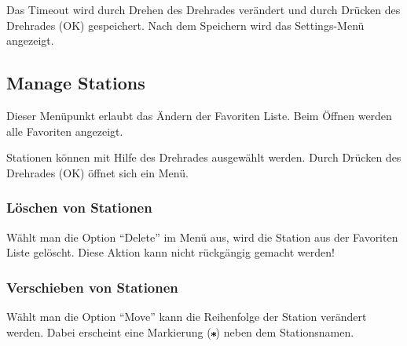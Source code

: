\documentclass[12pt,a4paper,openany]{memoir}
\begin{document}
Das Timeout wird durch Drehen des Drehrades verändert und durch Drücken des Drehrades (OK) gespeichert. Nach dem Speichern wird das Settings-Menü angezeigt. 


\subsection{Manage Stations}
Dieser Menüpunkt erlaubt das Ändern der Favoriten Liste. Beim Öffnen werden alle Favoriten angezeigt. 


Stationen können mit Hilfe des Drehrades ausgewählt werden. Durch Drücken des Drehrades (OK) öffnet sich ein Menü. 


\subsubsection{Löschen von Stationen}
Wählt man die Option ``Delete'' im Menü aus, wird die Station aus der Favoriten Liste gelöscht. 
Diese Aktion kann nicht rückgängig gemacht werden!

\subsubsection{Verschieben von Stationen}
Wählt man die Option ``Move'' kann die Reihenfolge der Station verändert werden. Dabei erscheint eine Markierung (\includegraphics[width=6px]{images/marker.png}) neben dem Stationsnamen. 

\end{document}
